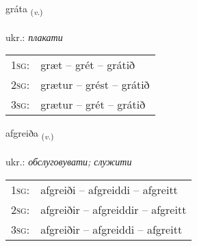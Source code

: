 \documentclass[frontgrid, backgrid]{flacards}\usepackage[]{graphicx}\usepackage[]{xcolor}
\begin{document}
\renewcommand{\flhead}{\vskip5pt \fboxsep=0pt {\small\bfseries\footnotesize Sagnorð | дієслово}}
\renewcommand{\fcfoot}{\vskip5pt \fboxsep=0pt \hspace{2pt}{\small\bfseries\footnotesize 2K}}

\renewcommand{\blhead}{\vskip5pt {\small\bfseries\footnotesize Sagnorð | дієслово }}
\renewcommand{\bcfoot}{\vskip5pt \hspace{2pt}{\small\bfseries\footnotesize 2K}}


{gráta \small{\textsubscript{(\textit{v.})}} \\[1ex] %
\textphonetic{[krauːta]} \\
ukr.: \emph{плакати} \\  [2ex]
\renewcommand*{\arraystretch}{0.8}
\begin{tabular}{p{1cm}l}
\textsc{1sg}: & græt -- grét -- grátið \\ 
\textsc{2sg}: & grætur -- grést -- grátið \\ 
\textsc{3sg}: & grætur -- grét -- grátið \\ 
\end{tabular}
}

\renewcommand{\flhead}{\vskip5pt \fboxsep=0pt {\small\bfseries\footnotesize Sagnorð | дієслово}}
\renewcommand{\fcfoot}{\vskip5pt \fboxsep=0pt \hspace{2pt}{\small\bfseries\footnotesize 2K}}

\renewcommand{\blhead}{\vskip5pt {\small\bfseries\footnotesize Sagnorð | дієслово }}
\renewcommand{\bcfoot}{\vskip5pt \hspace{2pt}{\small\bfseries\footnotesize 2K}}


{afgreiða \small{\textsubscript{(\textit{v.})}} \\[1ex] %
\textphonetic{[avkreiða]} \\
ukr.: \emph{обслуговувати; служити} \\  [2ex]
\renewcommand*{\arraystretch}{0.8}
\begin{tabular}{p{1cm}l}
\textsc{1sg}: & afgreiði -- afgreiddi -- afgreitt \\ 
\textsc{2sg}: & afgreiðir -- afgreiddir -- afgreitt \\ 
\textsc{3sg}: & afgreiðir -- afgreiddi -- afgreitt \\ 
\end{tabular}
}
\end{document}

